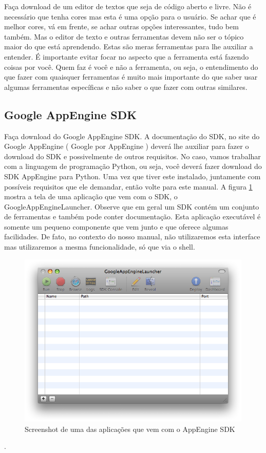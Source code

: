\documentclass[a4paper]{article}
\begin{document}
Faça download de um editor de textos que seja de código aberto e livre. Não é necessário que tenha cores mas esta é uma opção para o usuário. Se achar que é melhor cores, vá em frente, se achar outras opções interessantes, tudo bem também. Mas o editor de texto e outras ferramentas devem não ser o tópico maior do que está aprendendo. Estas são meras ferramentas para lhe auxiliar a entender. É importante evitar focar no aspecto que a ferramenta está fazendo coisas por você. Quem faz é você e não a ferramenta, ou seja, o entendimento do que fazer com quaisquer ferramentas é muito mais importante do que saber usar algumas ferramentas específicas e não saber o que fazer com outras similares. 

\subsection {Google AppEngine SDK} 

Faça download do Google AppEngine SDK. A documentação do SDK, no site do Google AppEngine ( Google por AppEngine ) deverá lhe auxiliar para fazer o download do SDK e possivelmente de outros requisitos. No caso, vamos trabalhar com a linguagem de programação Python, ou seja, você deverá fazer download do SDK AppEngine para Python. Uma vez que tiver este instalado, juntamente com possíveis requisitos que ele demandar, então volte para este manual. A figura  \ref{fig:appengine-sdk} mostra a tela de uma aplicação que vem com o SDK, o GoogleAppEngineLauncher. Observe que em geral um SDK contém um conjunto de ferramentas e também pode conter documentação. Esta aplicação executável é somente um pequeno componente que vem junto e que oferece algumas facilidades. De fato, no contexto do nosso manual, não utilizaremos esta interface mas utilizaremos a mesma funcionalidade, só que via o shell.


\begin{figure}[!h]
\centering
\includegraphics[width=4.4in]{image-appengine.png}
\caption{Screenshot de uma das aplicações que vem com o AppEngine SDK}
\label{fig:appengine-sdk}
\end{figure}.
\end{document}
